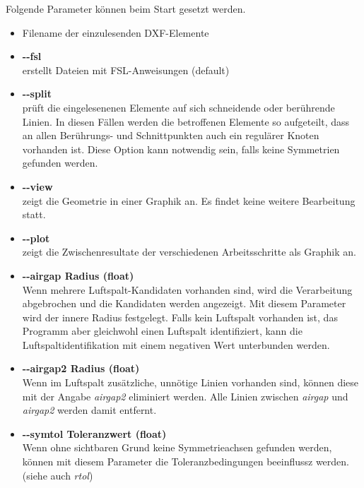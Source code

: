 \documentclass[10pt, a4paper,german]{scrartcl}
\newcommand{\Slanted}[1]{{\normalfont\slshape #1}}
\newcommand{\LongArg}[1]{\mbox{{-}{-}#1}}
\begin{document}
Folgende Parameter können beim Start gesetzt werden.
\begin{itemize}
\item Filename der einzulesenden DXF-Elemente
\item {\bfseries{\LongArg{fsl}}}\\
  erstellt Dateien mit FSL-Anweisungen (default)
                
\item {\bfseries{\LongArg{split}}}\\
		prüft die eingelesenenen Elemente auf sich schneidende oder berührende Linien.
		In diesen Fällen werden die betroffenen Elemente so aufgeteilt,
		dass an allen Berührungs- und Schnittpunkten auch ein regulärer Knoten vorhanden ist. 
                Diese Option kann notwendig sein, falls keine Symmetrien gefunden werden.
		
\item {\bfseries{\LongArg{view}}}\\
		zeigt die Geometrie in einer Graphik an. Es findet keine weitere Bearbeitung statt.
		
\item {\bfseries{\LongArg{plot}}}\\
		zeigt die Zwischenresultate der verschiedenen Arbeitsschritte als Graphik an.
		
\item {\bfseries{\LongArg{airgap} Radius (float)}}\\
		Wenn mehrere Luftspalt-Kandidaten vorhanden sind, wird die Verarbeitung abgebrochen und
		die Kandidaten werden angezeigt. Mit diesem Parameter wird der innere Radius festgelegt.
		Falls kein Luftspalt vorhanden ist, das Programm aber gleichwohl einen Luftspalt identifiziert,
                kann die Luftspaltidentifikation mit einem negativen Wert unterbunden werden.

\item 	{\bfseries{\LongArg{airgap2} Radius (float)}}\\
		Wenn im Luftspalt zusätzliche, unnötige Linien vorhanden sind, können diese mit der
		Angabe \Slanted{airgap2} eliminiert werden. Alle Linien zwischen \Slanted{airgap} und
		\Slanted{airgap2} werden damit entfernt.
		
\item {\bfseries{\LongArg{symtol} Toleranzwert (float)}}\\
		Wenn ohne sichtbaren Grund keine Symmetrieachsen gefunden werden, können mit diesem Parameter
		die Toleranzbedingungen beeinflussz werden.
		(siehe auch \Slanted{rtol})
		

\end{itemize}
\end{document}
